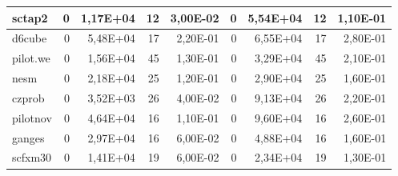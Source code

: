 \begin{tabular}{|l|r|r|r|r|r|r|r|r|}
sctap2 & 0 & 1,17E+04 & 12 & 3,00E-02 & 0 & 5,54E+04 & 12 & 1,10E-01 \\ \hline
d6cube & 0 & 5,48E+04 & 17 & 2,20E-01 & 0 & 6,55E+04 & 17 & 2,80E-01 \\ \hline
pilot.we & 0 & 1,56E+04 & 45 & 1,30E-01 & 0 & 3,29E+04 & 45 & 2,10E-01 \\ \hline
nesm & 0 & 2,18E+04 & 25 & 1,20E-01 & 0 & 2,90E+04 & 25 & 1,60E-01 \\ \hline
czprob & 0 & 3,52E+03 & 26 & 4,00E-02 & 0 & 9,13E+04 & 26 & 2,20E-01 \\ \hline
pilotnov & 0 & 4,64E+04 & 16 & 1,10E-01 & 0 & 9,60E+04 & 16 & 2,60E-01 \\ \hline
ganges & 0 & 2,97E+04 & 16 & 6,00E-02 & 0 & 4,88E+04 & 16 & 1,60E-01 \\ \hline
scfxm30 & 0 & 1,41E+04 & 19 & 6,00E-02 & 0 & 2,34E+04 & 19 & 1,30E-01 \\ \hline
\end{tabular}

